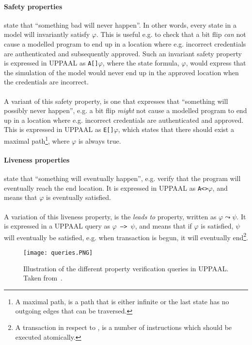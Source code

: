 \paragraph{Safety properties} state that ``something bad will never happen''. In other words, every state in a model will invariantly satisfy $\varphi$. This is useful e.g. to check that a bit flip \textit{can} not cause a modelled program to end up in a location where e.g. incorrect credentials are authenticated and subsequently approved. Such an invariant safety property is expressed in UPPAAL as \texttt{A[]$\varphi$}, where the state formula, $\varphi$, would express that the simulation of the model would never end up in the approved location when the credentials are incorrect.\\\\
A variant of this safety property, is one that expresses that ``something will possibly never happen'', e.g. a bit flip \textit{might} not cause a modelled program to end up in a location where e.g. incorrect credentials are authenticated and approved. This is expressed in UPPAAL as \texttt{E[]$\varphi$}, which states that there should exist a maximal path\footnote{A maximal path, is a path that is either infinite or the last state has no outgoing edges that can be traversed.}, where $\varphi$ is always true.
\paragraph{Liveness properties} state that ``something will eventually happen'', e.g. verify that the program will eventually reach the end location. It is expressed in UPPAAL as \texttt{A<>$\varphi$}, and means that $\varphi$ is eventually satisfied.\\\\
A variation of this liveness property, is the \textit{leads to} property, written as $\varphi \leadsto \psi$. It is expressed in a UPPAAL query as \texttt{$\varphi$ --> $\psi$}, and means that if $\varphi$ is satisfied, $\psi$ will eventually be satisfied, e.g. when \jc transaction is begun, it will eventually end\footnote{A transaction in respect to \jc, is a number of instructions which should be executed atomically.}.

\begin{figure}[H]
\centering
\texttt{[image: queries.PNG]}
\caption{Illustration of the different property verification queries in UPPAAL. Taken from~\cite[p. 8]{upptut}.}
\label{fig:query}
\end{figure}

